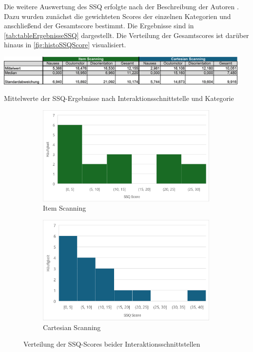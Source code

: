 Die weitere Auswertung des SSQ erfolgte nach der Beschreibung der Autoren \citep{kennedy_simulator_1993}. Dazu wurden zunächst die gewichteten Scores der einzelnen Kategorien und anschließend der Gesamtscore bestimmt. Die Ergebnisse sind in \autoref{tab:tableErgebnisseSSQ} dargestellt. Die Verteilung der Gesamtscores ist darüber hinaus in \autoref{fig:histoSSQScore} visualisiert. 

\begin{table}[tbh]
    \centering
    \includegraphics[width=0.95\textwidth]{images/Results/Tabelle-Ergebnisse-SSQ.png}
    \caption{Mittelwerte der SSQ-Ergebnisse nach Interaktionsschnittstelle und Kategorie}
    \label{tab:tableErgebnisseSSQ}
\end{table}

\begin{figure}
    \centering
    \begin{subfigure}{.5\textwidth}
        \centering
        \includegraphics[width=0.99\textwidth]{images/Results/Histogramm-SSQScores-Item.png}
        \caption{Item Scanning}
        \label{fig:histoSSQItem}   
    \end{subfigure}%
    \begin{subfigure}{.5\textwidth}
        \centering
        \includegraphics[width=0.99\textwidth]{images/Results/Histogramm-SSQScores-Cartesian.png}
         \caption{Cartesian Scanning}
         \label{fig:histoSSQCartesian}
    \end{subfigure}
    \caption{Verteilung der SSQ-Scores beider Interaktionsschnittstellen}
    \label{fig:histoSSQScore}
\end{figure}

